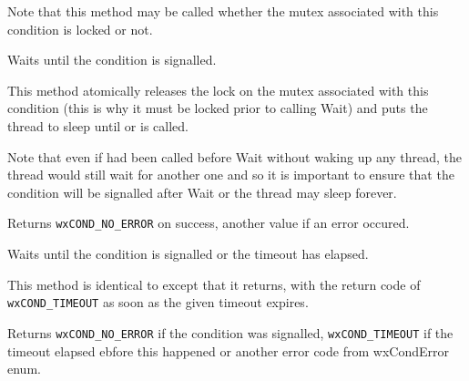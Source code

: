 Note that this method may be called whether the mutex associated with this
condition is locked or not.



\label{wxconditionwait}


Waits until the condition is signalled.

This method atomically releases the lock on the mutex associated with this
condition (this is why it must be locked prior to calling Wait) and puts the
thread to sleep until  or 
 is called.

Note that even if  had been called before
Wait without waking up any thread, the thread would still wait for another one
and so it is important to ensure that the condition will be signalled after
Wait or the thread may sleep forever.


Returns {\tt wxCOND\_NO\_ERROR} on success, another value if an error occured.




\label{wxconditionwaittimeout}


Waits until the condition is signalled or the timeout has elapsed.

This method is identical to  except that it
returns, with the return code of {\tt wxCOND\_TIMEOUT} as soon as the given
timeout expires.




Returns {\tt wxCOND\_NO\_ERROR} if the condition was signalled, 
{\tt wxCOND\_TIMEOUT} if the timeout elapsed ebfore this happened or another
error code from wxCondError enum.


